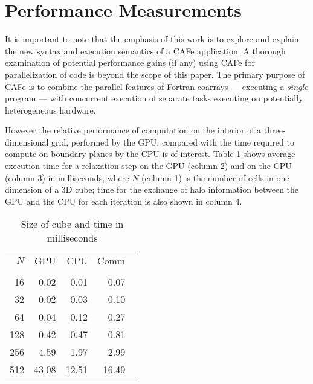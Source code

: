 \section{Performance Measurements}

It is important to note that the emphasis of this work is to explore and explain the new
syntax and execution semantics of a CAFe application.  A thorough examination of potential
performance gains (if any) using CAFe for parallelization of code is beyond the scope of
this paper.  The primary purpose of CAFe is to combine the parallel features of Fortran coarrays
--- executing a \emph{single} program --- with concurrent execution of separate tasks executing on
potentially heterogeneous hardware.

\begin{comment}
However, the relative performance of computation on a cluster of GPUs compared with the
necessary communication of halo information is of interest, especially considering that a
complete exchange of halo data involves communication between multiple coarray images
\emph{and} between each individual host image and its subimage (an attached OpenCL
device).
\end{comment}

However the relative performance of computation on the interior of a three-dimensional
grid, performed by the GPU, compared with the time required to compute on boundary planes by the
CPU is of interest.  Table 1 shows average execution time for a relaxation step on the GPU
(column 2) and on the CPU (column 3) in milliseconds, where $N$ (column 1) is the number of
cells in one dimension of a 3D cube; time for the exchange of halo information
between the GPU and the CPU for each iteration is also shown in column 4.

\begin{table}[]
\centering
\caption{Size of cube and time in milliseconds}
\label{table1}
\begin{tabular}{rrrrr}
$N$   &   GPU	 &  CPU         &   Comm    \\
      &   	 &              &           \\
16    &  0.02    &   0.01	&   0.07    \\
32    &  0.02    &   0.03       &   0.10    \\
64    &  0.04    &   0.12       &   0.27    \\
128   &  0.42    &   0.47	&   0.81    \\
256   &  4.59    &   1.97	&   2.99    \\
512   & 43.08    &   12.51	&  16.49    \\
\end{tabular}
\end{table}

